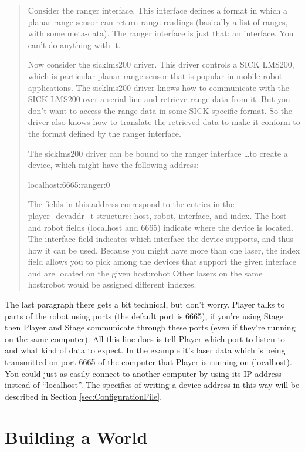 \documentclass[a4paper]{report}
\newcommand{\pl}{Player\xspace}
\begin{document}
\begin{quotation}
Consider the ranger interface. This interface defines a format in which a planar range-sensor can return range readings (basically a list of ranges, with some meta-data). The ranger interface is just that: an interface. You can't do anything with it.

Now consider the sicklms200 driver. This driver controls a SICK LMS200, which is particular planar range sensor that is popular in mobile robot applications. The sicklms200 driver knows how to communicate with the SICK LMS200 over a serial line and retrieve range data from it. But you don't want to access the range data in some SICK-specific format. So the driver also knows how to translate the retrieved data to make it conform to the format defined by the ranger interface.

	The sicklms200 driver can be bound to the ranger interface \ldots to create a device, which might have the following address:

	localhost:6665:ranger:0 
	
The fields in this address correspond to the entries in the \mbox{player\_devaddr\_t} structure: host, robot, interface, and index. The host and robot fields (localhost and 6665) indicate where the device is located. The interface field indicates which interface the device supports, and thus how it can be used. 
Because you might have more than one laser, the index field allows you to pick among the devices that support the given interface and are located on the given host:robot Other lasers on the same host:robot would be assigned different indexes.
\end{quotation}

The last paragraph there gets a bit technical, but don't worry. \pl talks to parts of the robot using ports (the default port is 6665), if you're using Stage then \pl and Stage communicate through these ports (even if they're running on the same computer). 
All this line does is tell \pl which port to listen to and what kind of data to expect. In the example it's laser data which is being transmitted on port 6665 of the computer that \pl is running on (localhost). 
You could just as easily connect to another computer by using its IP address instead of ``localhost''. The specifics of writing a device address in this way will be described in Section \ref{sec:ConfigurationFile}.


\chapter{Building a World} \label{sec:BuildingAWorld}
\end{document}
